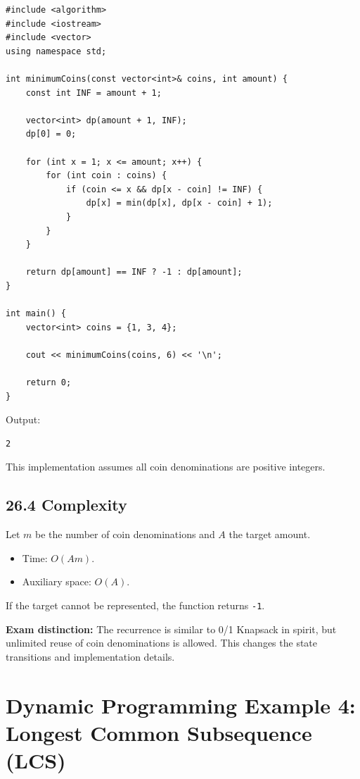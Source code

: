 \begin{lstlisting}[style=cppstyle]
#include <algorithm>
#include <iostream>
#include <vector>
using namespace std;

int minimumCoins(const vector<int>& coins, int amount) {
    const int INF = amount + 1;

    vector<int> dp(amount + 1, INF);
    dp[0] = 0;

    for (int x = 1; x <= amount; x++) {
        for (int coin : coins) {
            if (coin <= x && dp[x - coin] != INF) {
                dp[x] = min(dp[x], dp[x - coin] + 1);
            }
        }
    }

    return dp[amount] == INF ? -1 : dp[amount];
}

int main() {
    vector<int> coins = {1, 3, 4};

    cout << minimumCoins(coins, 6) << '\n';

    return 0;
}
\end{lstlisting}

Output:

\begin{lstlisting}[style=pseudocode]
2
\end{lstlisting}

This implementation assumes all coin denominations are positive integers.

\subsection{26.4 Complexity}

Let $m$ be the number of coin denominations and $A$ the target amount.

\begin{itemize}
    \item Time: $O(Am)$.
    \item Auxiliary space: $O(A)$.
\end{itemize}

If the target cannot be represented, the function returns \texttt{-1}.

\textbf{Exam distinction:} The recurrence is similar to 0/1 Knapsack in spirit, but unlimited reuse of coin denominations is allowed. This changes the state transitions and implementation details.

\section{Dynamic Programming Example 4: Longest Common Subsequence (LCS)}


